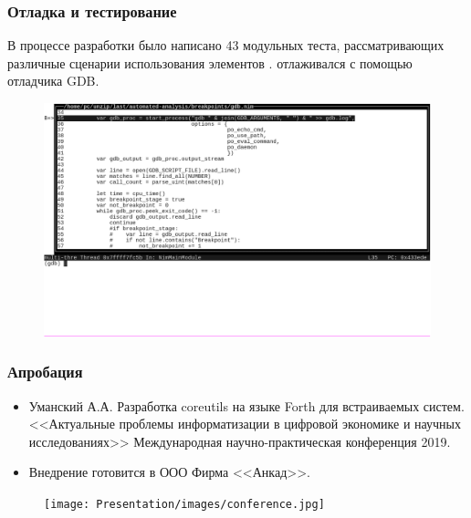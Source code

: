 \begin{frame}%
\frametitle{Отладка и тестирование {\ProgModule}}
    В процессе разработки {\ProgModule} было написано 43 модульных теста, рассматривающих
    различные сценарии использования элементов {\ProgModule}. {\ProgModule} отлаживался
    с помощью отладчика GDB.
    
    \vspace{3ex}
    \begin{figure}[!htbp]
        \begin{adjustbox}{max totalsize={1.2\textwidth}{1.2\textheight}}
            \includegraphics[trim={0 24ex 0 0 0},clip,width=\linewidth]{images/running-gdb.png}
        \end{adjustbox}
    \end{figure}

\end{frame}

\begin{frame}%
\frametitle{Апробация}
    \begin{itemize}
        \item Уманский А.А. Разработка coreutils на языке Forth для встраиваемых систем.
            <<Актуальные проблемы информатизации в цифровой экономике и научных исследованиях>>
            Международная научно-практическая конференция 2019.
        \item Внедрение {\ProgModule} готовится в ООО Фирма <<Анкад>>.
    \end{itemize}
    \begin{figure}[!htbp]
        \begin{adjustbox}{max totalsize={0.6\textwidth}{0.6\textheight}}
            \texttt{[image: Presentation/images/conference.jpg]}
        \end{adjustbox}
    \end{figure}
\end{frame}

